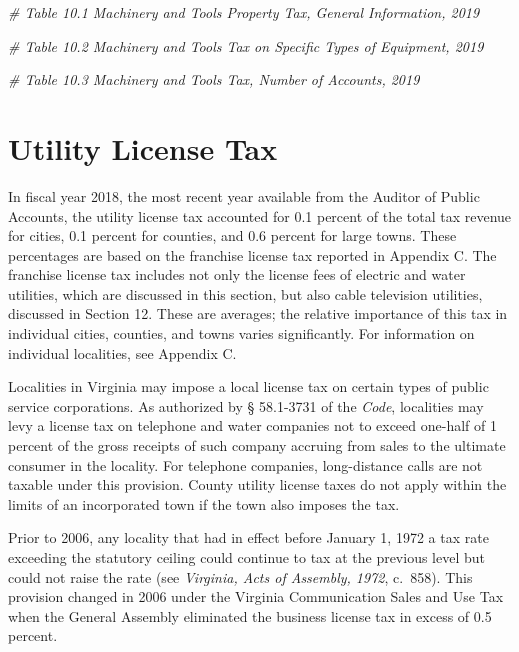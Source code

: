 \documentclass[
]{book}
\newenvironment{Shaded}{\begin{snugshade}}{\end{snugshade}}
\newcommand{\CommentTok}[1]{\textcolor[rgb]{0.56,0.35,0.01}{\textit{#1}}}
\begin{document}
\begin{Shaded}
\begin{Highlighting}[]
\CommentTok{\# Table 10.1 Machinery and Tools Property Tax, General Information, 2019}

\CommentTok{\# Table 10.2 Machinery and Tools Tax on Specific Types of Equipment, 2019}

\CommentTok{\# Table 10.3 Machinery and Tools Tax, Number of Accounts, 2019}
\end{Highlighting}
\end{Shaded}

\hypertarget{utility-license-tax}{%
\chapter{Utility License Tax}\label{utility-license-tax}}

In fiscal year 2018, the most recent year available from the Auditor of Public Accounts, the utility license tax accounted for 0.1 percent of the total tax revenue for cities, 0.1 percent for counties, and 0.6 percent for large towns. These percentages are based on the franchise license tax reported in Appendix C. The franchise license tax includes not only the license fees of electric and water utilities, which are discussed in this section, but also cable television utilities, discussed in Section 12. These are averages; the relative importance of this tax in individual cities, counties, and towns varies significantly. For information on individual localities, see Appendix C.

Localities in Virginia may impose a local license tax on certain types of public service corporations. As authorized by § 58.1-3731 of the \emph{Code}, localities may levy a license tax on telephone and water companies not to exceed one-half of 1 percent of the gross receipts of such company accruing from sales to the ultimate consumer in the locality. For telephone companies, long-distance calls are not taxable under this provision. County utility license taxes do not apply within the limits of an incorporated town if the town also imposes the tax.

Prior to 2006, any locality that had in effect before January 1, 1972 a tax rate exceeding the statutory ceiling could continue to tax at the previous level but could not raise the rate (see \emph{Virginia, Acts of Assembly, 1972}, c.~858). This provision changed in 2006 under the Virginia Communication Sales and Use Tax when the General Assembly eliminated the business license tax in excess of 0.5 percent.
\end{document}

